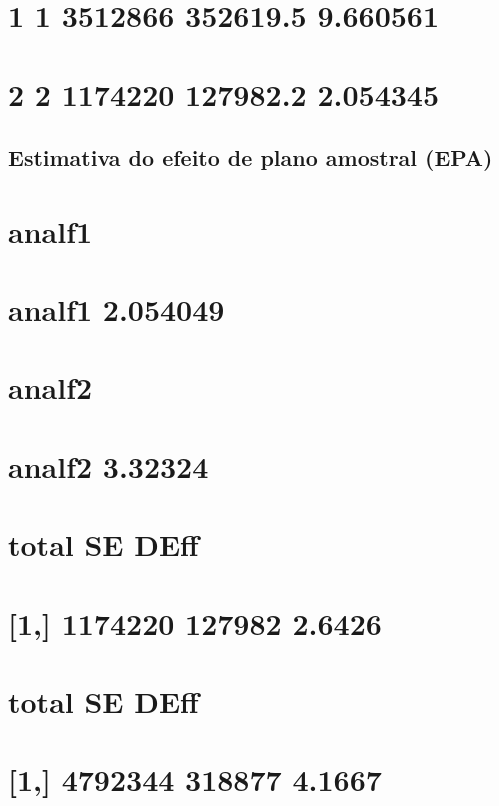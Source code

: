 \documentclass[]{book}
\theoremstyle{definition}
\theoremstyle{definition}
\theoremstyle{definition}
\theoremstyle{remark}
\begin{document}
\section{1 1 3512866 352619.5 9.660561}\label{section}

\section{2 2 1174220 127982.2 2.054345}\label{section-1}

\subsection{Estimativa do efeito de plano amostral
(EPA)}\label{estimativa-do-efeito-de-plano-amostral-epa}

\section{analf1}\label{analf1}

\section{analf1 2.054049}\label{analf1-2.054049}

\section{analf2}\label{analf2}

\section{analf2 3.32324}\label{analf2-3.32324}

\section{total SE DEff}\label{total-se-deff-2}

\section{{[}1,{]} 1174220 127982 2.6426}\label{section-2}

\section{total SE DEff}\label{total-se-deff-3}

\section{{[}1,{]} 4792344 318877 4.1667}\label{section-3}
\end{document}
